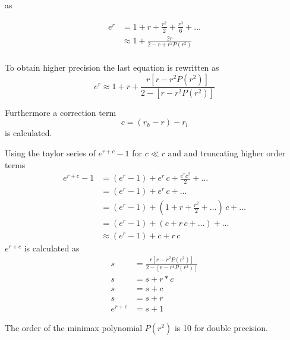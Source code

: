 \documentclass[10pt,a4paper,final,oneside]{article}
\numberwithin{equation}{subsection}
\begin{document}
    as

    \begin{equation}
        \begin{aligned}
            e^{r} &= 1 + r + \frac{r^2}{2} + \frac{r^3}{6} + \dots \\
                  &\approx  1 + \frac {2r} {2 -r + r^2 P(r^2)} \\
        \end{aligned}
    \end{equation}

    To obtain higher precision the last equation is rewritten as
    \begin{equation}
        e^{r} \approx  1 + r + \frac{r [r -r^2 P(r^2)]} {2-[r-r^2P(r^2)]}
    \end{equation}

    Furthermore a correction term
    \[
        c = (r_h - r) - r_l
    \]
    is calculated.

    Using the taylor series of $e^{r+c}-1$ for $c \ll r$ and and truncating
    higher order terms
    \begin{equation}
        \label{equ:expm1-taylor}
        \begin{aligned}
            e^{r+c}-1 &= (e^r-1) + e^r\,c  + \frac{e^r c^2}{2} + \dots \\
                      &= (e^r-1) + e^r\,c  + \dots \\
                      &= (e^r-1) + (1+r+\frac{r^2}{2}+\dots)\,c + \dots \\
                      &= (e^r-1) + (c + r\,c + \dots) + \dots \\
                      &\approx (e^r-1) + c + r\,c
        \end{aligned}
    \end{equation}
    $e^{r+c}$ is calculated as
    \begin{equation}
        \begin{aligned}
            s &= \frac{r [r -r^2 P(r^2)]} {2-[r-r^2P(r^2)]} \\
            s &= s + r*c \\
            s &= s + c \\
            s &= s + r \\
            e^{r+c} &= s + 1
        \end{aligned}
    \end{equation}


    The order of the minimax polynomial $P(r^2)$ is 10 for double precision.
\end{document}
